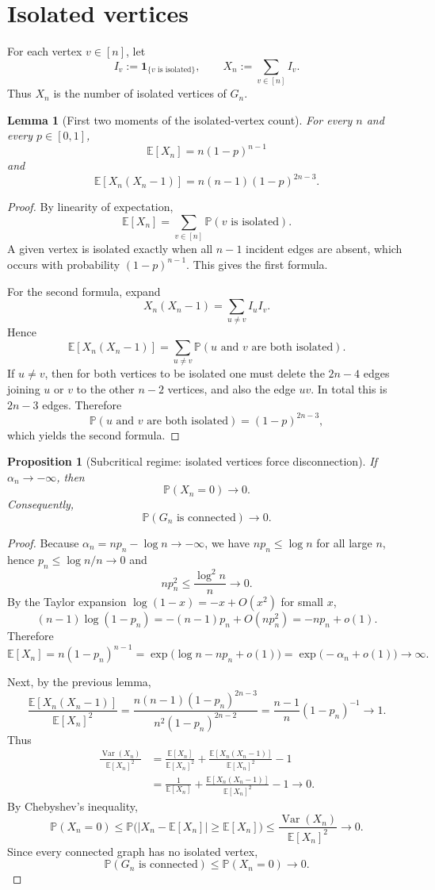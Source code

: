 \documentclass[11pt]{article}
\newcommand{\PP}{\mathbb{P}}
\newcommand{\EE}{\mathbb{E}}
\newcommand{\Var}{\operatorname{Var}}
\newcommand{\one}{\mathbf{1}}
\theoremstyle{plain}
\newtheorem{lemma}[theorem]{Lemma}
\newtheorem{proposition}[theorem]{Proposition}
\theoremstyle{definition}
\begin{document}
\section{Isolated vertices}

For each vertex $v\in[n]$, let
\[
I_v := \one_{\{v\text{ is isolated}\}},
\qquad
X_n := \sum_{v\in[n]} I_v.
\]
Thus $X_n$ is the number of isolated vertices of $G_n$.

\begin{lemma}[First two moments of the isolated-vertex count]
For every $n$ and every $p\in[0,1]$,
\[
\EE[X_n] = n(1-p)^{n-1}
\]
and
\[
\EE[X_n(X_n-1)] = n(n-1)(1-p)^{2n-3}.
\]
\end{lemma}

\begin{proof}
By linearity of expectation,
\[
\EE[X_n] = \sum_{v\in[n]} \PP(v\text{ is isolated}).
\]
A given vertex is isolated exactly when all $n-1$ incident edges are absent, which occurs with probability $(1-p)^{n-1}$.  This gives the first formula.

For the second formula, expand
\[
X_n(X_n-1) = \sum_{u\neq v} I_u I_v.
\]
Hence
\[
\EE[X_n(X_n-1)] = \sum_{u\neq v} \PP(u\text{ and }v\text{ are both isolated}).
\]
If $u\neq v$, then for both vertices to be isolated one must delete the $2n-4$ edges joining $u$ or $v$ to the other $n-2$ vertices, and also the edge $uv$.  In total this is $2n-3$ edges.  Therefore
\[
\PP(u\text{ and }v\text{ are both isolated})=(1-p)^{2n-3},
\]
which yields the second formula.
\end{proof}

\begin{proposition}[Subcritical regime: isolated vertices force disconnection]\label{prop:subcritical}
If $\alpha_n\to -\infty$, then
\[
\PP(X_n=0)\to 0.
\]
Consequently,
\[
\PP(G_n\text{ is connected})\to 0.
\]
\end{proposition}

\begin{proof}
Because $\alpha_n = np_n-\log n\to -\infty$, we have $np_n\le \log n$ for all large $n$, hence $p_n\le \log n/n\to 0$ and
\[
n p_n^2 \le \frac{\log^2 n}{n}\to 0.
\]
By the Taylor expansion $\log(1-x)=-x+O(x^2)$ for small $x$,
\[
(n-1)\log(1-p_n) = -(n-1)p_n + O(n p_n^2) = -n p_n + o(1).
\]
Therefore
\[
\EE[X_n]
= n(1-p_n)^{n-1}
= \exp\bigl(\log n - n p_n + o(1)\bigr)
= \exp\bigl(-\alpha_n + o(1)\bigr)\to \infty.
\]

Next, by the previous lemma,
\[
\frac{\EE[X_n(X_n-1)]}{\EE[X_n]^2}
=
\frac{n(n-1)(1-p_n)^{2n-3}}{n^2(1-p_n)^{2n-2}}
=
\frac{n-1}{n}(1-p_n)^{-1}
\to 1.
\]
Thus
\begin{align*}
\frac{\Var(X_n)}{\EE[X_n]^2}
&=
\frac{\EE[X_n]}{\EE[X_n]^2}
+
\frac{\EE[X_n(X_n-1)]}{\EE[X_n]^2}
-1 \\
&=
\frac{1}{\EE[X_n]}
+
\frac{\EE[X_n(X_n-1)]}{\EE[X_n]^2}
-1
\to 0.
\end{align*}
By Chebyshev's inequality,
\[
\PP(X_n=0)
\le
\PP\bigl(|X_n-\EE[X_n]|\ge \EE[X_n]\bigr)
\le
\frac{\Var(X_n)}{\EE[X_n]^2}
\to 0.
\]
Since every connected graph has no isolated vertex,
\[
\PP(G_n\text{ is connected}) \le \PP(X_n=0)\to 0.
\]
\end{proof}
\end{document}

